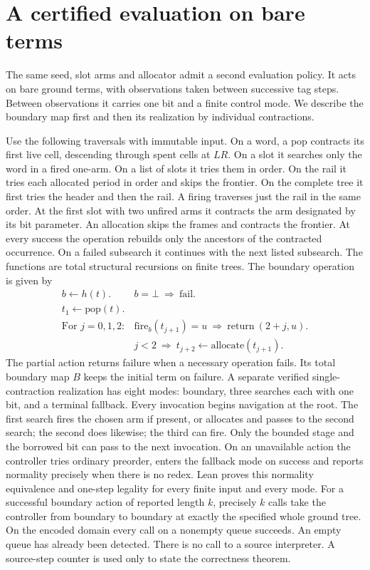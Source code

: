 \section{A certified evaluation on bare terms}
\label{certified}
The same seed, slot arms and allocator admit a second evaluation policy. It acts on bare ground terms, with observations taken between successive tag steps. Between observations it carries one bit and a finite control mode. We describe the boundary map first and then its realization by individual contractions.

Use the following traversals with immutable input. On a word, a pop contracts its first live cell, descending through spent cells at \(LR\). On a slot it searches only the word in a fired one-arm. On a list of slots it tries them in order. On the rail it tries each allocated period in order and skips the frontier. On the complete tree it first tries the header and then the rail. A firing traverses just the rail in the same order. At the first slot with two unfired arms it contracts the arm designated by its bit parameter. An allocation skips the frames and contracts the frontier. At every success the operation rebuilds only the ancestors of the contracted occurrence. On a failed subsearch it continues with the next listed subsearch. The functions are total structural recursions on finite trees. The boundary operation is given by
\[
\begin{array}{ll}
 b\gets h(t).& b=\bot\ \Longrightarrow\ \mathrm{fail}.\\
 t_1\gets\mathrm{pop}(t).&\\
 \text{For }j=0,1,2:&
  \mathrm{fire}_b(t_{j+1})=u\ \Longrightarrow\ \mathrm{return}\ (2+j,u).\\
 &j<2\ \Longrightarrow\ t_{j+2}\gets\mathrm{allocate}(t_{j+1}).
\end{array}
\]
The partial action returns failure when a necessary operation fails. Its total boundary map \(B\) keeps the initial term on failure. A separate verified single-contraction realization has eight modes: boundary, three searches each with one bit, and a terminal fallback. Every invocation begins navigation at the root. The first search fires the chosen arm if present, or allocates and passes to the second search; the second does likewise; the third can fire. Only the bounded stage and the borrowed bit can pass to the next invocation. On an unavailable action the controller tries ordinary preorder, enters the fallback mode on success and reports normality precisely when there is no redex. Lean proves this normality equivalence and one-step legality for every finite input and every mode. For a successful boundary action of reported length \(k\), precisely \(k\) calls take the controller from boundary to boundary at exactly the specified whole ground tree. On the encoded domain every call on a nonempty queue succeeds. An empty queue has already been detected. There is no call to a source interpreter. A source-step counter is used only to state the correctness theorem.


